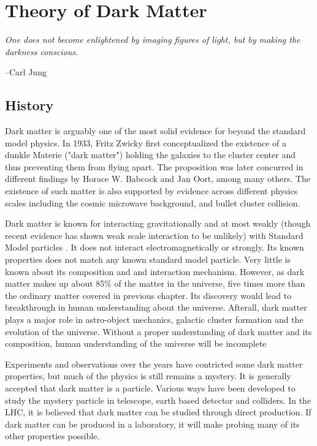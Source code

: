 \chapter{Theory of Dark Matter}


\epigraph{\textit{One does not become enlightened by imaging figures of light, but by making the darkness conscious.}}{--Carl Jung}


\section{History}
    Dark matter is arguably one of the most solid evidence for beyond the standard model physics. In 1933, Fritz Zwicky first conceptualized the existence of a dunkle Materie ("dark matter") holding the galaxies to the cluster center and thus preventing them from flying apart. The proposition was later concurred in different findings by Horace W. Babcock and Jan Oort, among many others. The existence of such matter is also supported by evidence across
    different physics scales including the cosmic microwave background, and bullet cluster collision.

    Dark matter is known for interacting gravitationally and at most weakly (though recent evidence has shown weak scale interaction to be unlikely) with Standard Model particles . It does not interact electromagnetically or strongly. Its known properties does not match any known standard model particle. Very little is known about its composition and and interaction mechanism. However, as dark matter makes up about 85\% of the matter in the universe, five times more than the ordinary matter covered in previous chapter. Its discovery would lead to breakthrough in human understanding about the universe. Afterall, dark matter plays a major role in astro-object mechanics, galactic cluster formation and the evolution of the universe. Without a proper understanding of dark matter and its composition, human understanding of the universe will be incomplete

    Experiments and observations over the years have contricted some dark matter properties, but much of the physics is still remains a mystery. It is generally accepted that dark matter is a particle. Various ways have been developed to study the mystery particle in telescope, earth based detector and colliders. In the LHC, it is believed that dark matter can be studied through direct production. If dark matter can be produced in a laboratory, it will make probing many of its other properties possible. 

